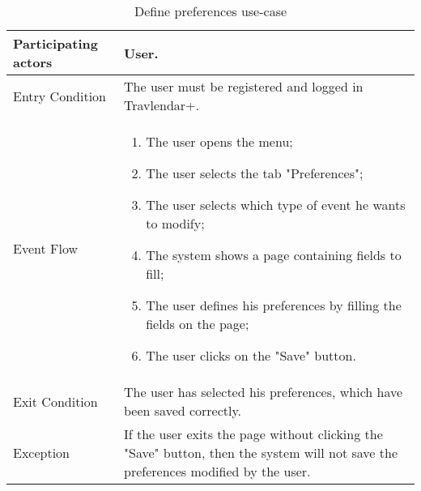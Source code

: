 \begin{table}[H]
	\begin{center}
		\begin{tabular}{ | p{} | p{} | }
		\hline
		Participating actors & User.\\
		\hline
		Entry Condition & The user must be registered and logged in Travlendar+.\\
		\hline
		Event Flow & 
			\begin{enumerate}
				\item The user opens the menu;
				\item The user selects the tab "Preferences";
				\item The user selects which type of event he wants to modify;
				\item The system shows a page containing fields to fill;
				\item The user defines his preferences by filling the fields on the page;
				\item The user clicks on the "Save" button.
			\end{enumerate} \\
		\hline
		Exit Condition & The user has selected his preferences, which have been saved correctly.\\
		\hline
		Exception & If the user exits the page without clicking the "Save" button, then the system will not save the preferences modified by the user.\\ 
		\hline
		\end{tabular}
	\end{center}
	\caption{Define preferences use-case}
\end{table}